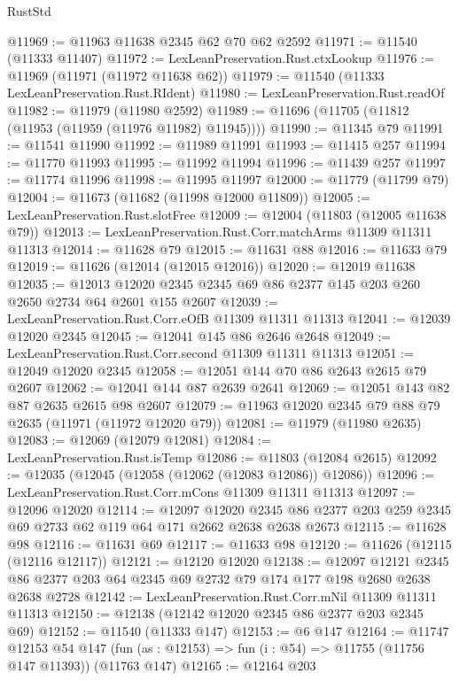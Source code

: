 \begin{lexlean}{RustStd}
\begin{coremodule}
@11969 := @11963 @11638 @2345 @62 @70 @62 @2592
@11971 := @11540 (@11333 @11407)
@11972 := LexLeanPreservation.Rust.ctxLookup
@11976 := @11969 (@11971 (@11972 @11638 @62))
@11979 := @11540 (@11333 LexLeanPreservation.Rust.RIdent)
@11980 := LexLeanPreservation.Rust.readOf
@11982 := @11979 (@11980 @2592)
@11989 := @11696 (@11705 (@11812 (@11953 (@11959 (@11976 @11982) @11945))))
@11990 := @11345 @79
@11991 := @11541 @11990
@11992 := @11989 @11991
@11993 := @11415 @257
@11994 := @11770 @11993
@11995 := @11992 @11994
@11996 := @11439 @257
@11997 := @11774 @11996
@11998 := @11995 @11997
@12000 := @11779 (@11799 @79)
@12004 := @11673 (@11682 (@11998 @12000 @11809))
@12005 := LexLeanPreservation.Rust.slotFree
@12009 := @12004 (@11803 (@12005 @11638 @79))
@12013 := LexLeanPreservation.Rust.Corr.matchArms @11309 @11311 @11313
@12014 := @11628 @79
@12015 := @11631 @88
@12016 := @11633 @79
@12019 := @11626 (@12014 (@12015 @12016))
@12020 := @12019 @11638
@12035 := @12013 @12020 @2345 @2345 @69 @86 @2377 @145 @203 @260 @2650 @2734 @64 @2601 @155 @2607
@12039 := LexLeanPreservation.Rust.Corr.eOfB @11309 @11311 @11313
@12041 := @12039 @12020 @2345
@12045 := @12041 @145 @86 @2646 @2648
@12049 := LexLeanPreservation.Rust.Corr.second @11309 @11311 @11313
@12051 := @12049 @12020 @2345
@12058 := @12051 @144 @70 @86 @2643 @2615 @79 @2607
@12062 := @12041 @144 @87 @2639 @2641
@12069 := @12051 @143 @82 @87 @2635 @2615 @98 @2607
@12079 := @11963 @12020 @2345 @79 @88 @79 @2635 (@11971 (@11972 @12020 @79))
@12081 := @11979 (@11980 @2635)
@12083 := @12069 (@12079 @12081)
@12084 := LexLeanPreservation.Rust.isTemp
@12086 := @11803 (@12084 @2615)
@12092 := @12035 (@12045 (@12058 (@12062 (@12083 @12086)) @12086))
@12096 := LexLeanPreservation.Rust.Corr.mCons @11309 @11311 @11313
@12097 := @12096 @12020
@12114 := @12097
    @12020
    @2345
    @86
    @2377
    @203
    @259
    @2345
    @69
    @2733
    @62
    @119
    @64
    @171
    @2662
    @2638
    @2638
    @2673
@12115 := @11628 @98
@12116 := @11631 @69
@12117 := @11633 @98
@12120 := @11626 (@12115 (@12116 @12117))
@12121 := @12120 @12020
@12138 := @12097
    @12121
    @2345
    @86
    @2377
    @203
    @64
    @2345
    @69
    @2732
    @79
    @174
    @177
    @198
    @2680
    @2638
    @2638
    @2728
@12142 := LexLeanPreservation.Rust.Corr.mNil @11309 @11311 @11313
@12150 := @12138 (@12142 @12020 @2345 @86 @2377 @203 @2345 @69)
@12152 := @11540 (@11333 @147)
@12153 := @6 @147
@12164 := @11747
    @12153
    @54
    @147
    (fun (as : @12153) => fun (i : @54) => @11755 (@11756 @147 @11393))
    (@11763 @147)
@12165 := @12164 @203

\end{coremodule}
\end{lexlean}
